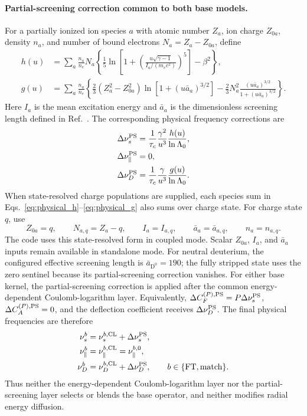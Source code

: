 \documentclass[11pt]{article}
\begin{document}
\paragraph{Partial-screening correction common to both base models.}
For a partially ionized ion species $a$ with atomic number $Z_a$, ion charge
$Z_{0a}$, density $n_a$, and number of bound electrons $N_a=Z_a-Z_{0a}$, define
\cite{Hesslow2017Screening,Hesslow2018Collision}
\begin{align}
 h(u)
 &=\sum_a\frac{n_a}{n_e}N_a
 \left\{
  \frac15\ln\left[
   1+\left(\frac{u\sqrt{\gamma-1}}{I_a/(m_ec^2)}\right)^5
  \right]-\beta^2
 \right\},
 \label{eq:physical_h}\\
 g(u)
 &=\sum_a\frac{n_a}{n_e}
 \left\{
  \frac23(Z_a^2-Z_{0a}^2)
       \ln\left[1+(u\bar a_a)^{3/2}\right]
  -\frac23N_a^2
       \frac{(u\bar a_a)^{3/2}}{1+(u\bar a_a)^{3/2}}
 \right\}.
 \label{eq:physical_g}
\end{align}
Here $I_a$ is the mean excitation energy and $\bar a_a$ is the dimensionless screening
length defined in Ref.~\cite{Hesslow2018Collision}.  The corresponding physical
frequency corrections are
\begin{align}
 \Delta\nu_s^{\rm PS}
 &=\frac{1}{\tau_c}\frac{\gamma^2}{u^3}
   \frac{h(u)}{\ln\Lambda_0},\\
 \Delta\nu_\parallel^{\rm PS}&=0,\\
 \Delta\nu_D^{\rm PS}
 &=\frac{1}{\tau_c}\frac{\gamma}{u^3}
   \frac{g(u)}{\ln\Lambda_0}.
 \label{eq:physical_partial_screening_overlay}
\end{align}
When state-resolved charge populations are supplied, each species sum in
Eqs.~\eqref{eq:physical_h}--\eqref{eq:physical_g} also sums over charge state.  For
charge state $q$, use
\begin{equation}
 Z_{0a}=q,\qquad N_{a,q}=Z_a-q,\qquad
 I_a=I_{a,q},\qquad \bar a_a=\bar a_{a,q},\qquad
 n_a=n_{a,q}.
 \label{eq:physical_resolved_screening_inputs}
\end{equation}
The code uses this state-resolved form in coupled mode.  Scalar $Z_{0a}$, $I_a$, and
$\bar a_a$ inputs remain available in standalone mode.
For neutral deuterium, the configured effective screening length is
$\bar a_{\mathrm{D^0}}=190$; the fully stripped state uses the zero sentinel because
its partial-screening correction vanishes.
For either base kernel, the partial-screening correction is applied after the common
energy-dependent Coulomb-logarithm layer.  Equivalently,
$\Delta C_F^{(P),\rm PS}=P\Delta\nu_s^{\rm PS}$,
$\Delta C_A^{(P),\rm PS}=0$, and the deflection coefficient receives
$\Delta\nu_D^{\rm PS}$.  The final physical frequencies are therefore
\begin{align}
 \nu_s^b&=\nu_s^{b,\rm CL}+\Delta\nu_s^{\rm PS},\\
 \nu_\parallel^b&=\nu_\parallel^{b,\rm CL}=\nu_\parallel^{b,0},\\
 \nu_D^b&=\nu_D^{b,\rm CL}+\Delta\nu_D^{\rm PS},
 \qquad b\in\{\mathrm{FT},\mathrm{match}\}.
 \label{eq:physical_final_collision_layers}
\end{align}
Thus neither the energy-dependent Coulomb-logarithm layer nor the partial-screening layer
selects or blends the base operator, and neither modifies radial energy diffusion.
\end{document}
